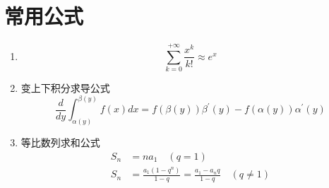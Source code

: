 \section{常用公式}
\begin{enumerate}
	\item 
	\begin{equation}
		\sum_{k=0}^{+\infty}\frac{x^k}{k!} \approx e^x
	\end{equation}

	\item 变上下积分求导公式
	\begin{equation}
		\frac{d}{dy}\int_{\alpha{(y)}}^{\beta{(y)}}f(x)dx = f(\beta(y)){\beta^{'}(y)} - f(\alpha(y)){\alpha^{'}(y)}
	\end{equation}

	\item 等比数列求和公式
	\begin{equation}
	 	\begin{aligned}
			S_n &= n a_1 \quad (q = 1) \\
			S_n &=  \frac{a_1(1-q^n)}{1-q} = \frac{a_1 - a_n q}{1-q} \quad (q \neq 1)
		\end{aligned}
	 \end{equation}


\end{enumerate}